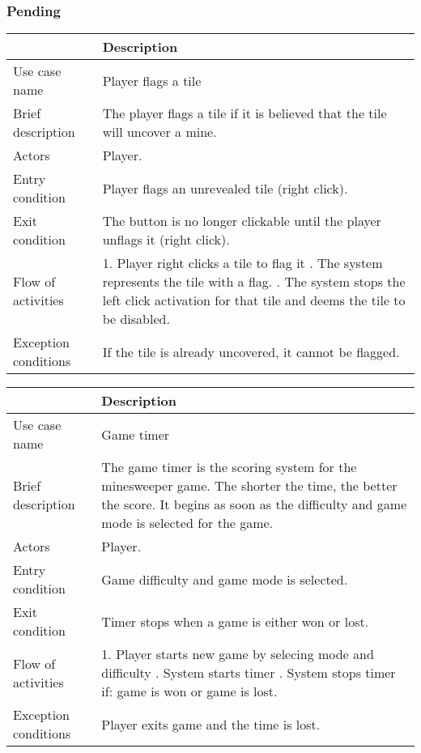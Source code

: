 \documentclass[12pt, a4]{report}
\begin{document}
\pagebreak 
	\subsubsection{Pending}
	\begin{table}[ht]
	\begin{tabular}{|p{4cm}|p{12cm}|}
		\hline
		 & Description \\
		\hline
		Use case name & Player flags a tile \\
		Brief description & The player flags a tile if it is believed that the tile will uncover a mine. \\
		Actors & Player. \\
		Entry condition & Player flags an unrevealed tile (right click). \\
		Exit condition & The button is no longer clickable until the player unflags it (right click). \\
		Flow of activities & 1. Player right clicks a tile to flag it \newline 2. The system represents the tile with a flag. \newline 3. The system stops the left click activation for that tile and deems the tile to be disabled. \\
		Exception conditions & If the tile is already uncovered, it cannot be flagged.\\
		\hline
	\end{tabular}
	\end{table}

	\begin{table}[ht]
	\begin{tabular}{|p{4cm}|p{12cm}|}
		\hline
		 & Description \\
		\hline
		Use case name & Game timer \\
		Brief description & The game timer is the scoring system for the minesweeper game. The shorter the time, the better the score. It begins as soon as the difficulty and game mode is selected for the game. \\
		Actors & Player. \\
		Entry condition & Game difficulty and game mode is selected. \\
		Exit condition & Timer stops when a game is either won or lost. \\
		Flow of activities & 1. Player starts new game by selecing mode and difficulty \newline 2. System starts timer \newline 3. System stops timer if: game is won or game is lost. \\
		Exception conditions & Player exits game and the time is lost.\\
		\hline
	\end{tabular}
	\end{table}
\end{document}
